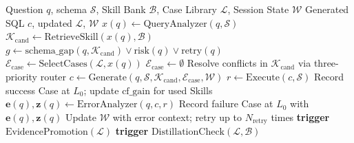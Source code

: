 \begin{algorithm}[t]
\caption{SQLSkill Inference Pipeline}
\label{alg:inference}
\begin{algorithmic}[1]
\REQUIRE Question $q$, schema $\mathcal{S}$, Skill Bank $\mathcal{B}$, Case Library $\mathcal{L}$, Session State $\mathcal{W}$
\ENSURE Generated SQL $c$, updated $\mathcal{L}$, $\mathcal{W}$
\STATE $x(q) \leftarrow \text{QueryAnalyzer}(q, \mathcal{S})$ 
\STATE $\mathcal{K}_{\text{cand}} \leftarrow \text{RetrieveSkill}(x(q), \mathcal{B})$ 
\STATE $g \leftarrow \text{schema\_gap}(q, \mathcal{K}_{\text{cand}}) \vee \text{risk}(q) \vee \text{retry}(q)$
  \STATE $\mathcal{E}_{\text{case}} \leftarrow \text{SelectCases}(\mathcal{L}, x(q))$ 
\ELSE
  \STATE $\mathcal{E}_{\text{case}} \leftarrow \emptyset$
\ENDIF
\STATE Resolve conflicts in $\mathcal{K}_{\text{cand}}$ via three-priority router
\STATE $c \leftarrow \text{Generate}(q, \mathcal{S}, \mathcal{K}_{\text{cand}}, \mathcal{E}_{\text{case}}, \mathcal{W})$
\STATE $r \leftarrow \text{Execute}(c, \mathcal{S})$
  \STATE Record success Case at $L_0$; update $\text{cf\_gain}$ for used Skills
\ELSE
  \STATE $\mathbf{e}(q), \mathbf{z}(q) \leftarrow \text{ErrorAnalyzer}(q, c, r)$ 
  \STATE Record failure Case at $L_0$ with $\mathbf{e}(q), \mathbf{z}(q)$
  \STATE Update $\mathcal{W}$ with error context; retry up to $N_{\text{retry}}$ times
\ENDIF
\STATE \textbf{trigger} $\text{EvidencePromotion}(\mathcal{L})$ 
\STATE \textbf{trigger} $\text{DistillationCheck}(\mathcal{L}, \mathcal{B})$ 
\end{algorithmic}
\end{algorithm}

